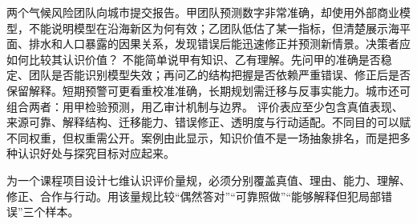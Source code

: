 两个气候风险团队向城市提交报告。甲团队预测数字非常准确，却使用外部商业模型，不能说明模型在沿海新区为何有效；乙团队低估了某一指标，但清楚展示海平面、排水和人口暴露的因果关系，发现错误后能迅速修正并预测新情景。决策者应如何比较其认识价值？ 不能简单说甲有知识、乙有理解。先问甲的准确是否稳定、团队是否能识别模型失效；再问乙的结构把握是否依赖严重错误、修正后是否保留解释。短期预警可更看重校准准确，长期规划需迁移与反事实能力。城市还可组合两者：用甲检验预测，用乙审计机制与边界。 评价表应至少包含真值表现、来源可靠、解释结构、迁移能力、错误修正、透明度与行动适配。不同目的可以赋不同权重，但权重需公开。案例由此显示，知识价值不是一场抽象排名，而是把多种认识好处与探究目标对应起来。

\begin{tcolorbox}[breakable,colback=white,colframe=blue!30!black,title={专题研读任务},fonttitle=\bfseries]
为一个课程项目设计七维认识评价量规，必须分别覆盖真值、理由、能力、理解、修正、合作与行动。用该量规比较“偶然答对”“可靠照做”“能够解释但犯局部错误”三个样本。
\end{tcolorbox}

